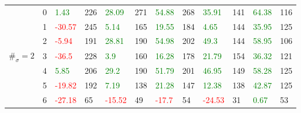 \begin{table}[!htb]
\begin{adjustwidth}{-0.8in}{-0.9in}
\begin{tabular}{|p{4em}|p{2em}|p{3em}|p{3em}|p{3em}|p{3em}|p{3em}|p{3em}|p{3em}|p{3em}|p{3em}|p{3em}|}
            & 0 & \textcolor{green}{1.43} & 226 & \textcolor{green}{28.09} & 271 & \textcolor{green}{54.88} & 268 & \textcolor{green}{35.91} & 141 & \textcolor{green}{64.38} & 116\\\cline{3-12}
            & 1 & \textcolor{red}{-30.57} & 245 & \textcolor{green}{5.14} & 165 & \textcolor{green}{19.55} & 184 & \textcolor{green}{4.65} & 144 & \textcolor{green}{35.95} & 125\\\cline{3-12}
            & 2 & \textcolor{red}{-5.94} & 191 & \textcolor{green}{28.81} & 190 & \textcolor{green}{54.98} & 202 & \textcolor{green}{49.3} & 144 & \textcolor{green}{58.95} & 106\\\cline{3-12}
            $\#_{\sigma}=2$ & 3 & \textcolor{red}{-36.5} & 228 & \textcolor{green}{3.9} & 160 & \textcolor{green}{16.28} & 178 & \textcolor{green}{21.79} & 154 & \textcolor{green}{36.32} & 121\\\cline{3-12}
            & 4 & \textcolor{green}{5.85} & 206 & \textcolor{green}{29.2} & 190 & \textcolor{green}{51.79} & 201 & \textcolor{green}{46.95} & 149 & \textcolor{green}{58.28} & 125\\\cline{3-12}
            & 5 & \textcolor{red}{-19.82} & 192 & \textcolor{green}{7.19} & 138 & \textcolor{green}{21.28} & 147 & \textcolor{green}{12.38} & 138 & \textcolor{green}{42.87} & 125\\\cline{3-12}
            & 6 & \textcolor{red}{-27.18} & 65 & \textcolor{red}{-15.52} & 49 & \textcolor{red}{-17.7} & 54 & \textcolor{red}{-24.53} & 31 & \textcolor{green}{0.67} & 53\\\hline\hline


\end{tabular}
\end{adjustwidth}
\end{table}
